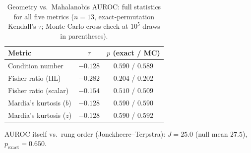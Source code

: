 \begin{table}[htbp]
\centering
\caption{Geometry vs.\ Mahalanobis AUROC: full statistics for all five metrics ($n=13$, exact-permutation Kendall's $\tau$; Monte Carlo cross-check at $10^5$ draws in parentheses).}
\label{tab:s2-auroc-stats}
\small
\begin{tabular}{lcc}
\toprule
Metric & $\tau$ & $p$ (exact / MC) \\
\midrule
Condition number       & $-0.128$ & $0.590$ / $0.589$ \\
Fisher ratio (HL)      & $-0.282$ & $0.204$ / $0.202$ \\
Fisher ratio (scalar)  & $-0.154$ & $0.510$ / $0.509$ \\
Mardia's kurtosis ($b$) & $-0.128$ & $0.590$ / $0.590$ \\
Mardia's kurtosis ($z$) & $-0.128$ & $0.590$ / $0.592$ \\
\bottomrule
\end{tabular}

\vspace{0.3cm}
\small AUROC itself vs.\ rung order (Jonckheere--Terpstra): $J=25.0$ (null mean $27.5$), $p_{\mathrm{exact}}=0.650$.
\end{table}
